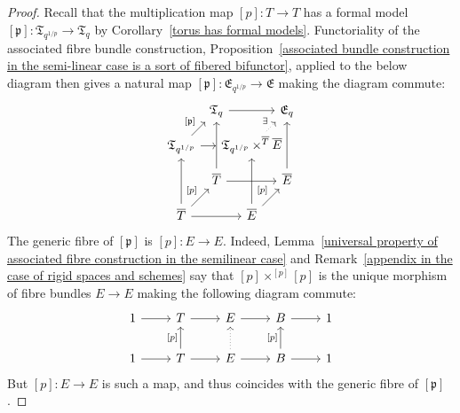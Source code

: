 \documentclass[10pt,oneside]{amsart}
\theoremstyle{definition}
\begin{document}
	\begin{proof}
		Recall that the multiplication map $[p]:T\rightarrow T$ has a formal model $[\mathfrak p]:\mathfrak T_{q^{1/p}}\rightarrow \mathfrak T_q$ by Corollary~\ref{torus has formal models}. 
		Functoriality of the associated fibre bundle construction, Proposition~\ref{associated bundle construction in the semi-linear case is a sort of fibered bifunctor}, applied to the below diagram then gives a natural map $[\mathfrak p]:\mathfrak E_{q^{1/p}}\rightarrow \mathfrak E$ making the diagram commute:
			\begin{equation}\label{formal model of p-multiplication cube}
			\begin{tikzcd}[column sep={1cm,between origins},row sep={1cm,between origins}]
				& \mathfrak T_{q} \arrow[rr] &  & \mathfrak E_q \\
				\mathfrak T_{q^{1/p}} \arrow[ru, "{[\mathfrak p]}"] \arrow[rr] &  & \mathfrak T_{q^{1/p}}\times^{\overline{T}}\overline{E} \arrow[ru, "\exists", dotted] &  \\
				& \overline{T} \arrow[uu] \arrow[rr] &  & \overline{E} \arrow[uu] \\
				\overline{T} \arrow[uu] \arrow[rr] \arrow[ru, "{[p]}"] &  & \overline{E} \arrow[uu] \arrow[ru, "{[p]}"] & 
			\end{tikzcd}
			\end{equation}
		The generic fibre of $[\mathfrak p]$ is $[p]:E\to E$. 
		Indeed, Lemma~\ref{universal property of associated fibre construction in the semilinear case} and Remark~\ref{appendix in the case of rigid spaces and schemes} say that $[p]\times^{[p]}[p]$ is the unique morphism of fibre bundles $E\rightarrow E$ making the following diagram commute:
		\begin{equation}\label{rigid p-multiplication cube}
		\begin{tikzcd}
		1 \arrow[r] & T \arrow[r]                    & E \arrow[r]                   & B \arrow[r]                    & 1 \\
		1 \arrow[r] & T \arrow[u, "{[p]}"] \arrow[r] & E \arrow[u, dotted] \arrow[r] & B \arrow[u, "{[p]}"] \arrow[r] & 1
		\end{tikzcd}
		\end{equation}
		But $[p]:E\rightarrow E$ is such a map, and thus coincides with the generic fibre of $[\mathfrak p]$.
	

\end{proof}
\end{document}

